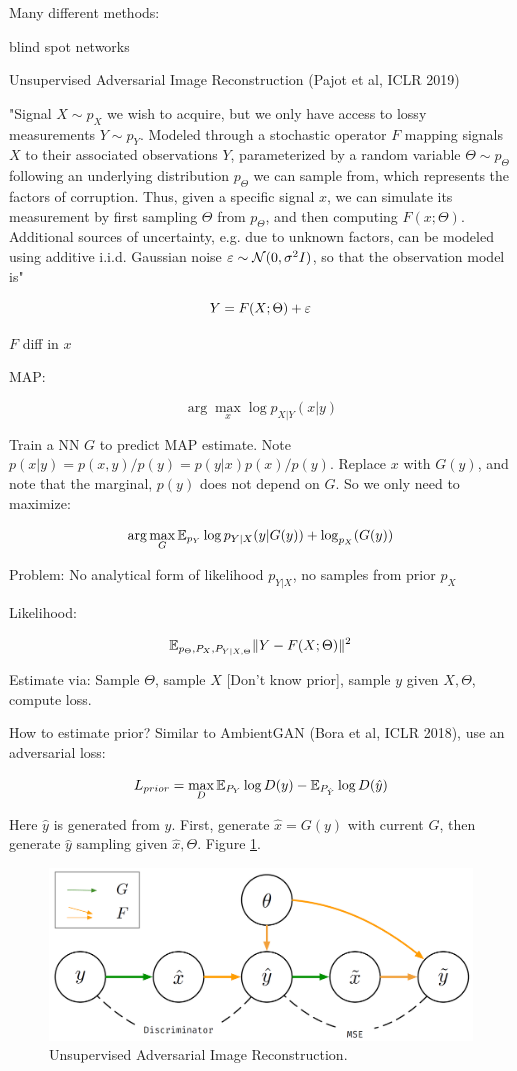 \documentclass[english]{article}
\begin{document}
Many different methods:

blind spot networks

\item Unsupervised Adversarial Image Reconstruction (Pajot et al, ICLR 2019)

"Signal $X \sim p_X$ we wish to acquire, but we only have access to lossy measurements $Y \sim p_Y$. Modeled through a
stochastic operator $F$ mapping signals $X$ to their associated observations $Y$, parameterized by a random variable
$\Theta \sim p_\Theta$ following an underlying distribution $p_\Theta$ we can sample from, which represents the factors
of corruption. Thus, given a specific signal $x$, we can simulate its measurement by first sampling
$\Theta$ from $p_\Theta$, and then computing $F(x;\Theta)$. Additional sources of uncertainty, e.g. due to unknown
factors, can be modeled using additive i.i.d. Gaussian noise $\varepsilon \sim \mathcal{N}(0,\sigma^2I)$, so that the
observation model is"

$$Y = F(X;\Theta) + \varepsilon$$ 

$F$ diff in $x$

MAP: 

$$\arg\max_x \log p_{X|Y}(x|y)$$

Train a NN $G$ to predict MAP estimate. Note $p(x|y) = p(x,y)/p(y) = p(y|x)p(x)/p(y)$. Replace $x$ with $G(y)$, and note that the marginal, $p(y)$ does not depend on $G$. So we only need to maximize:

$$\arg\max_G \mathbb{E}_{p_Y}\log p_{Y|X}(y|G(y))+\log_{p_X}(G(y))$$

Problem: No analytical form of likelihood $p_{Y|X}$, no samples from prior $p_X$

Likelihood: 

$$\mathbb{E}_{p_\Theta,P_X,P_{Y|X,\Theta}}\|Y-F(X;\Theta)\|^2$$

Estimate via: Sample $\Theta$, sample $X$ [Don't know prior], sample $y$ given $X,\Theta$, compute loss. 

How to estimate prior? Similar to AmbientGAN (Bora et al, ICLR 2018), use an adversarial loss:

$$L_{prior} = \max_D 
\mathbb{E}_{P_{Y}}\log D(y)
- 
\mathbb{E}_{P_{\hat Y}}\log D(\hat  y)$$

Here $\hat y$ is generated from $y$. First, generate $\hat x = G(y)$ with current $G$, then generate $\hat y$ sampling given $\hat x,\Theta$. Figure \ref{UAIR}.

\begin{figure}
  \centering
  \includegraphics[scale=0.3]{UAIR}
  \caption{Unsupervised Adversarial Image Reconstruction.}
  \label{UAIR} 
\end{figure}
\end{document}
